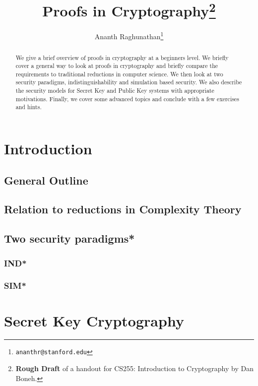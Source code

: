 \documentclass[A4, 11pt]{article}
\begin{document}
\title{Proofs in Cryptography\footnote{{\bf Rough Draft} of a handout for
CS255: Introduction to Cryptography by Dan Boneh.}}
\author{Ananth Raghunathan\thanks{{\tt ananthr@stanford.edu}}}
\date{}
\maketitle

\begin{abstract}
We give a brief overview of proofs in cryptography at a beginners level. We
briefly cover a general way to look at proofs in cryptography and briefly
compare the requirements to traditional reductions in computer science. We
then look at two security paradigms, indistinguishability and simulation
based security. We also describe the security models for Secret Key and
Public Key systems with appropriate motivations. Finally, we cover some
advanced topics and conclude with a few exercises and hints.
\end{abstract}

\section{Introduction}

\subsection{General Outline}

\subsection{Relation to reductions in Complexity Theory}

\subsection{Two security paradigms*}

\subsubsection{IND*}

\subsubsection{SIM*}

\pagebreak
\section{Secret Key Cryptography}
\end{document}
